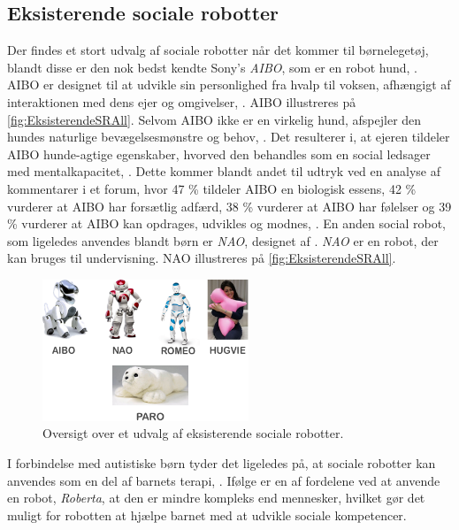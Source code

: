 \subsection{Eksisterende sociale robotter}
\label{EksisterendeSocialeRobotter}
%
Der findes et stort udvalg af sociale robotter når det kommer til børnelegetøj, blandt disse er den nok bedst kendte Sony's \textit{AIBO}, som er en robot hund, \parencite{WEB:AIBO}. AIBO er designet til at udvikle sin personlighed fra hvalp til voksen, afhængigt af interaktionen med dens ejer og omgivelser, \parencite{WEB:AIBO}. AIBO illustreres på \autoref{fig:EksisterendeSRAll}. Selvom AIBO ikke er en virkelig hund, afspejler den hundes naturlige bevægelsesmønstre og behov, \parencite[ss. 191-198]{PDF:AnEthologicalEmotional}. Det resulterer i, at ejeren tildeler AIBO hunde-agtige egenskaber, hvorved den behandles som en social ledsager med mentalkapacitet, \parencite[s. 2]{PDF:SharingALifeHarvey}. Dette kommer blandt andet til udtryk ved en analyse af kommentarer i et forum, hvor 47 \% tildeler AIBO en biologisk essens, 42 \% vurderer at AIBO har forsætlig adfærd, 38 \% vurderer at AIBO har følelser og 39 \% vurderer at AIBO kan opdrages, udvikles og modnes, \parencite[s. 26]{PDF:InTheCompanyofRobots}. En anden social robot, som ligeledes anvendes blandt børn er \textit{NAO}, designet af \textcite{WEB:NAO}. \textit{NAO} er en robot, der kan bruges til undervisning. NAO illustreres på \autoref{fig:EksisterendeSRAll}.
%
\begin{figure}[H]
\centering
\includegraphics[width = 0.55\textwidth]{Figure/EksisterendeSRAll} 
\caption{Oversigt over et udvalg af eksisterende sociale robotter.}
\label{fig:EksisterendeSRAll}
\end{figure}
\noindent 
%  
I forbindelse med autistiske børn tyder det ligeledes på, at sociale robotter kan anvendes som en del af barnets terapi, \parencite[s. 180]{PDF:GamesChrildrenAutism}. Ifølge \textcite[s. 185]{PDF:GamesChrildrenAutism} er en af fordelene ved at anvende en robot, \textit{Roberta}, at den er mindre kompleks end mennesker, hvilket gør det muligt for robotten at hjælpe barnet med at udvikle sociale kompetencer.
  
